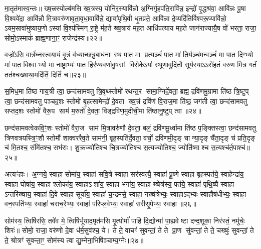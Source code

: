 मा॒तृत॑मास्व॒न्तः॥ ख्ष॒त्त्रस्योल्ब॑मसि ख्ष॒त्रस्य॒ योनि॑र॒स्यावि॑न्नो अ॒ग्निर्गृ॒हप॑ति॒रावि॑न्न॒ इन्द्रो॑ वृ॒द्धश्र॑वा॒ आवि॑न्नः पू॒षा वि॒श्ववे॑दा॒ आवि॑न्नौ मि॒त्रावरु॑णावृता॒वृधा॒वावि॑न्ने॒ द्यावा॑पृथि॒वी धृ॒तव्र॑ते॒ आवि॑न्ना दे॒व्यदि॑तिर्विश्वरू॒प्यावि॑न्नो॒ ऽयम॒सावा॑मुष्याय॒णोऽस्यां वि॒श्य॑स्मिन् रा॒ष्ट्रे म॑ह॒ते ख्ष॒त्राय॑ मह॒त आधि॑पत्याय मह॒ते जान॑राज्यायै॒ष वो॑ भरता॒ राजा॒ सोमो॒ऽस्माकं॑ ब्राह्म॒णाना॒ꣳ॒ राजेन्द्र॑स्य॥२२॥

वज्रो॑ऽसि॒ वार्त्र॑घ्न॒स्त्वया॒यं वृ॒त्रं व॑ध्याच्छत्रु॒बाध॑नाः स्थ पा॒त मा प्र॒त्यञ्चं॑ पा॒त मा॑ ति॒र्यञ्च॑म॒न्वञ्चं॑ मा पात दि॒ग्भ्यो मा॑ पात॒ विश्वाभ्यो मा ना॒ष्ट्राभ्यः॑ पात॒ हिर॑ण्यवर्णावु॒षसां विरो॒केऽयः॑ स्थूणा॒वुदि॑तौ॒ सूर्य॒स्याऽऽरो॑हतं वरुण मित्र॒ गर्तं॒ तत॑श्चख्षाथा॒मदि॑तिं॒ दितिं॑ च॥२३॥

{\anuvakamend[{शिशु॒रिन्द्र॒स्यैक॑चत्वारिशच्च॥12॥}]}

स॒मिध॒मा ति॑ष्ठ गाय॒त्री त्वा॒ छन्द॑सामवतु त्रि॒वृथ्स्तोमो॑ रथन्त॒र सामा॒ग्निर्दे॒वता॒ ब्रह्म॒ द्रवि॑णमु॒ग्रामा ति॑ष्ठ त्रि॒ष्टुप् त्वा॒ छन्द॑सामवतु पञ्चद॒शः स्तोमो॑ बृ॒हत्सामेन्द्रो॑ दे॒वता ख्ष॒त्त्रं द्रवि॑णं वि॒राज॒मा ति॑ष्ठ॒ जग॑ती त्वा॒ छन्द॑सामवतु सप्तद॒शः स्तोमो॑ वैरू॒प साम॑ म॒रुतो॑ दे॒वता॒ विड्द्रवि॑ण॒मुदी॑ची॒मा ति॑ष्ठानु॒ष्टुप् त्वा॥२४॥

छन्द॑सामवत्वेकवि॒ꣳ॒शः स्तोमो॑ वैरा॒ज साम॑ मि॒त्रावरु॑णौ दे॒वता॒ बलं॒ द्रवि॑णमू॒र्ध्वामा ति॑ष्ठ प॒ङ्क्तिस्त्वा॒ छन्द॑सामवतु त्रिणवत्रयस्त्रि॒ꣳ॒शौ स्तोमौ॑ शाक्वररैव॒ते साम॑नी॒ बृह॒स्पति॑र्दे॒वता॒ वर्चो॒ द्रवि॑णमी॒दृङ् चान्या॒दृङ् चै॑ता॒दृङ् च॑ प्रति॒दृङ् च॑ मि॒तश्च॒ संमि॑तश्च॒ सभ॑राः। शु॒क्रज्यो॑तिश्च चि॒त्रज्यो॑तिश्च स॒त्यज्यो॑तिश्च॒ ज्योति॑ष्माश्च स॒त्यश्च॑र्त॒पाश्च॑॥२५॥

अत्यꣳ॑हाः। अ॒ग्नये॒ स्वाहा॒ सोमा॑य॒ स्वाहा॑ सवि॒त्रे स्वाहा॒ सर॑स्वत्यै॒ स्वाहा॑ पू॒ष्णे स्वाहा॒ बृह॒स्पत॑ये॒ स्वाहेन्द्रा॑य॒ स्वाहा॒ घोषा॑य॒ स्वाहा॒ श्लोका॑य॒ स्वाहाऽशा॑य॒ स्वाहा॒ भगा॑य॒ स्वाहा॒ ख्षेत्र॑स्य॒ पत॑ये॒ स्वाहा॑ पृथि॒व्यै स्वाहा॒ ऽन्तरि॑ख्षाय॒ स्वाहा॑ दि॒वे स्वाहा॒ सूर्या॑य॒ स्वाहा॑ च॒न्द्रम॑से॒ स्वाहा॒ नख्ष॑त्रेभ्यः॒ स्वाहा॒ऽद्भ्यः स्वाहौष॑धीभ्यः॒ स्वाहा॒ वन॒स्पति॑भ्यः॒ स्वाहा॑ चराच॒रेभ्यः॒ स्वाहा॑ परिप्ल॒वेभ्यः॒ स्वाहा॑ सरीसृ॒पेभ्यः॒ स्वाहा॥२६॥

{\anuvakamend[{अ॒नु॒ष्टुप्त्व॑र्त॒पाश्च॑ सरीसृ॒पेभ्यः॒ स्वाहा॥13॥}]}

सोम॑स्य॒ त्विषि॑रसि॒ तवे॑व मे॒ त्विषि॑र्भूयाद॒मृत॑मसि मृ॒त्योर्मा॑ पाहि दि॒द्योन्मा॑ पा॒ह्यवेष्टा दन्द॒शूका॒ निर॑स्तं॒ नमु॑चेः॒ शिरः॑॥ सोमो॒ राजा॒ वरु॑णो दे॒वा ध॑र्म॒सुव॑श्च॒ ये। ते ते॒ वाचꣳ॑ सुवन्तां॒ ते ते प्रा॒ण सु॑वन्तां॒ ते ते॒ चख्षुः॑ सुवन्तां॒ ते ते॒ श्रोत्रꣳ॑ सुवन्ता॒ꣳ॒ सोम॑स्य त्वा द्यु॒म्नेना॒भिषि॑ञ्चाम्य॒ग्नेः॥२७॥

